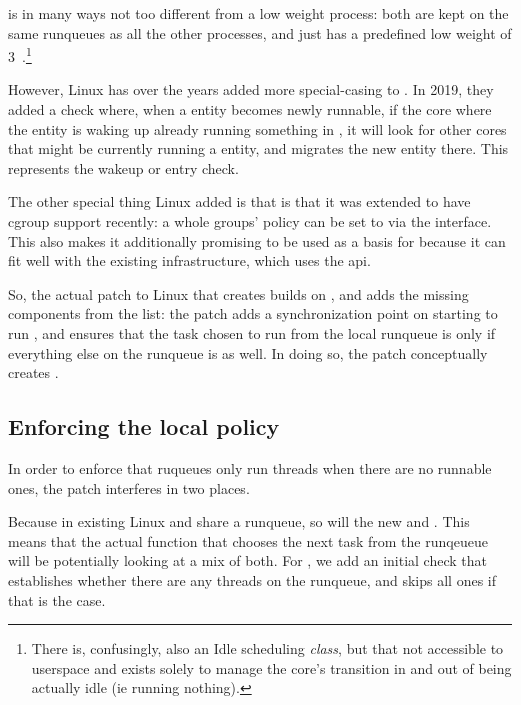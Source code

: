 \schedidle{} is in many ways not too different from a low weight \schednormal{}
process: both are kept on the same runqueues as all the other \schednormal{}
processes, and \schedidle{} just has a predefined low weight of
3~\cite{TODO}.\footnote{There is, confusingly, also an Idle scheduling
\textit{class}, but that not accessible to userspace and exists solely to manage
the core's transition in and out of being actually idle (ie running nothing).}

However, Linux has over the years added more special-casing to \schedidle{}. In
2019, they added a check where, when a \schednormal{} entity becomes newly
runnable, if the core where the entity is waking up already running something in
\schednormal{}, it will look for other cores that might be currently running a
\schedidle{} entity, and migrates the new entity there. This represents the
wakeup or entry check.

The other special thing Linux added is that \schedidle{} is that it was extended
to have cgroup support recently\cite{TODO}: a whole groups' policy can be set to
\schedidle{} via the \cgroups{} interface. This also makes it additionally
promising to be used as a basis for \schedbe{} because it can fit well with the
existing infrastructure, which uses the \cgroups{} api.

So, the actual patch to Linux that creates \schedbe{} builds on \schedidle{},
and adds the missing components from the list: the patch adds a synchronization
point on starting to run \schedidle{}, and ensures that the task chosen to run
from the local runqueue is only \schedidle{} if everything else on the runqueue
is as well. In doing so, the patch conceptually creates \schedbe{}.

\subsection{Enforcing the local policy}

In order to enforce that ruqueues only run \schedbe{} threads when there are no
runnable \schednormal{} ones, the patch interferes in two places. 

Because in existing Linux \schedidle{} and \schednormal{} share a runqueue, so
will the new \schedbe{} and \schednormal{}. This means that the actual function
that chooses the next task from the runqeueue will be potentially looking at a
mix of both. For \schedbe{}, we add an initial check that establishes whether
there are any \schednormal{} threads on the runqueue, and skips all \schedbe{}
ones if that is the case. 

